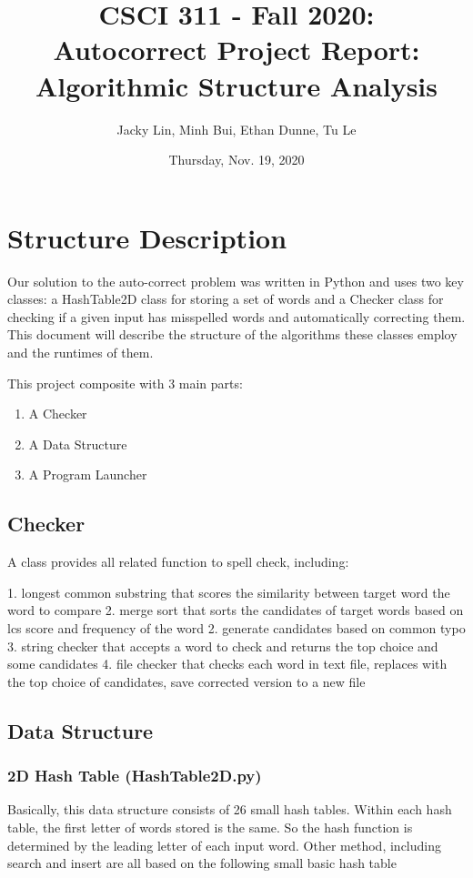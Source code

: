 \documentclass[10pt]{article}
\title{CSCI 311 - Fall 2020: \\Autocorrect Project Report: Algorithmic Structure Analysis}
\author {Jacky Lin, Minh Bui, Ethan Dunne, Tu Le}
\date{Thursday, Nov. 19, 2020}
\theoremstyle{definition}
\begin{document}
\maketitle


\section{Structure Description}
Our solution to the auto-correct problem was written in Python and uses two key classes: a HashTable2D class for storing a set of words and a Checker class for checking if a given input has misspelled words and automatically correcting them. This document will describe the structure of the algorithms these classes employ and the runtimes of them.

This project composite with 3 main parts:
\begin{enumerate}
    \item A Checker
    \item A Data Structure
    \item A Program Launcher
\end{enumerate}

\subsection{Checker}

A class provides all related function to spell check, including:

1. longest common substring that scores the similarity between target word the word to compare
2. merge sort that sorts the candidates of target words based on lcs score and frequency of the word
2. generate candidates based on common typo
3. string checker that accepts a word to check and returns the top choice and some candidates
4. file checker that checks each word in text file, replaces with the top choice of candidates, save corrected version to a new file

\subsection{Data Structure}

\subsubsection{2D Hash Table (HashTable2D.py)}
Basically, this data structure consists of 26 small hash tables. Within each hash table, the first letter of words stored is the same. So the hash function is determined by the leading letter of each input word. Other method, including search and insert are all based on the following small basic hash table
\end{document}
